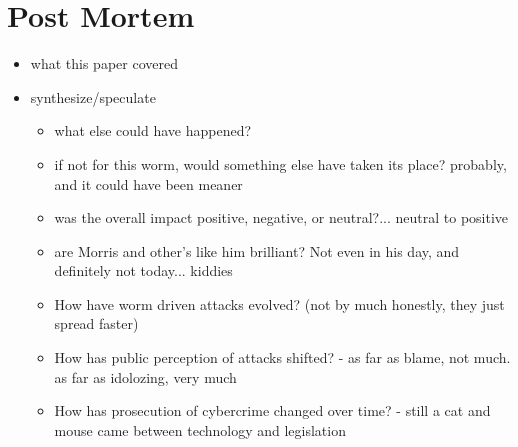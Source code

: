 \section*{Post Mortem}

\begin{itemize}
	\item what this paper covered
	\item synthesize/speculate
   		\begin{itemize}
   		\item what else could have happened?
        \item if not for this worm, would something else have taken its place? probably, and it could have been meaner
        \item was the overall impact positive, negative, or neutral?... neutral to positive
        \item are Morris and other's like him brilliant? Not even in his day, and definitely not today... kiddies
        \item How have worm driven attacks evolved? (not by much honestly, they just spread faster)
        \item How has public perception of attacks shifted? - as far as blame, not much. as far as idolozing, very much
        \item How has prosecution of cybercrime changed over time? - still a cat and mouse came between technology and legislation
   		\end{itemize} 
\end{itemize}
